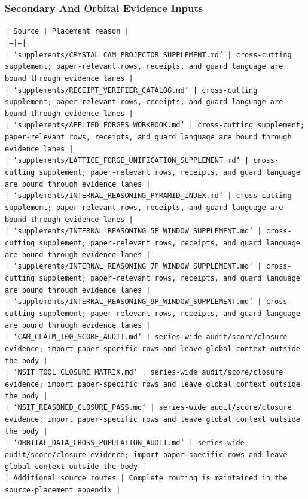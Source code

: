 \documentclass[11pt]{article}
\begin{document}
\subsubsection*{Secondary And Orbital Evidence Inputs}

\noindent\texttt{| Source | Placement reason |}\\
\noindent\texttt{|---|---|}\\
\noindent\texttt{| `supplements/CRYSTAL\_CAM\_PROJECTOR\_SUPPLEMENT.md` | cross-cutting supplement; paper-relevant rows, receipts, and guard language are bound through evidence lanes |}\\
\noindent\texttt{| `supplements/RECEIPT\_VERIFIER\_CATALOG.md` | cross-cutting supplement; paper-relevant rows, receipts, and guard language are bound through evidence lanes |}\\
\noindent\texttt{| `supplements/APPLIED\_FORGES\_WORKBOOK.md` | cross-cutting supplement; paper-relevant rows, receipts, and guard language are bound through evidence lanes |}\\
\noindent\texttt{| `supplements/LATTICE\_FORGE\_UNIFICATION\_SUPPLEMENT.md` | cross-cutting supplement; paper-relevant rows, receipts, and guard language are bound through evidence lanes |}\\
\noindent\texttt{| `supplements/INTERNAL\_REASONING\_PYRAMID\_INDEX.md` | cross-cutting supplement; paper-relevant rows, receipts, and guard language are bound through evidence lanes |}\\
\noindent\texttt{| `supplements/INTERNAL\_REASONING\_5P\_WINDOW\_SUPPLEMENT.md` | cross-cutting supplement; paper-relevant rows, receipts, and guard language are bound through evidence lanes |}\\
\noindent\texttt{| `supplements/INTERNAL\_REASONING\_7P\_WINDOW\_SUPPLEMENT.md` | cross-cutting supplement; paper-relevant rows, receipts, and guard language are bound through evidence lanes |}\\
\noindent\texttt{| `supplements/INTERNAL\_REASONING\_9P\_WINDOW\_SUPPLEMENT.md` | cross-cutting supplement; paper-relevant rows, receipts, and guard language are bound through evidence lanes |}\\
\noindent\texttt{| `CAM\_CLAIM\_100\_SCORE\_AUDIT.md` | series-wide audit/score/closure evidence; import paper-specific rows and leave global context outside the body |}\\
\noindent\texttt{| `NSIT\_TOOL\_CLOSURE\_MATRIX.md` | series-wide audit/score/closure evidence; import paper-specific rows and leave global context outside the body |}\\
\noindent\texttt{| `NSIT\_REASONED\_CLOSURE\_PASS.md` | series-wide audit/score/closure evidence; import paper-specific rows and leave global context outside the body |}\\
\noindent\texttt{| `ORBITAL\_DATA\_CROSS\_POPULATION\_AUDIT.md` | series-wide audit/score/closure evidence; import paper-specific rows and leave global context outside the body |}\\
\noindent\texttt{| Additional source routes | Complete routing is maintained in the source-placement appendix |}\\
\end{document}
